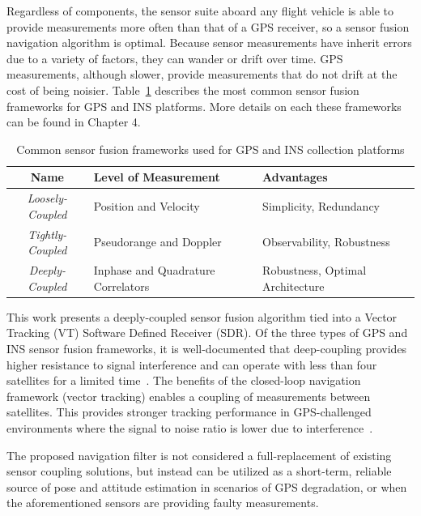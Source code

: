 Regardless of components, the sensor suite aboard any flight vehicle is able to provide measurements more often than that of a GPS receiver, so a sensor fusion navigation algorithm is optimal. Because sensor measurements have inherit errors due to a variety of factors, they can wander or drift over time. GPS measurements, although slower, provide measurements that do not drift at the cost of being noisier. Table~\ref{tbl:sensorfusionframeworks} describes the most common sensor fusion frameworks for GPS and INS platforms. More details on each these frameworks can be found in Chapter 4.
\begin{table}[!ht]
    \caption{Common sensor fusion frameworks used for GPS and INS collection platforms}\label{tbl:sensorfusionframeworks}
    \centering
    \begin{tabular}{cll}
        \toprule
        \textbf{Name}            & \textbf{Level of Measurement}      & \textbf{Advantages}              \\
        \midrule
        \textit{Loosely-Coupled} & Position and Velocity              & Simplicity, Redundancy           \\
        \textit{Tightly-Coupled} & Pseudorange and Doppler            & Observability, Robustness        \\
        \textit{Deeply-Coupled}  & Inphase and Quadrature Correlators & Robustness, Optimal Architecture \\
        \bottomrule
    \end{tabular}
\end{table}

This work presents a deeply-coupled sensor fusion algorithm tied into a Vector Tracking (VT) Software Defined Receiver (SDR). Of the three types of GPS and INS sensor fusion frameworks, it is well-documented that deep-coupling provides higher resistance to signal interference and can operate with less than four satellites for a limited time~\cite{wattsGPSGLONASSL12019}. The benefits of the closed-loop navigation framework (vector tracking) enables a coupling of measurements between satellites. This provides stronger tracking performance in GPS-challenged environments where the signal to noise ratio is lower due to interference~\cite{grierPositionNavigationTiming}.

The proposed navigation filter is not considered a full-replacement of existing sensor coupling solutions, but instead can be utilized as a short-term, reliable source of pose and attitude estimation in scenarios of GPS degradation, or when the aforementioned sensors are providing faulty measurements.

